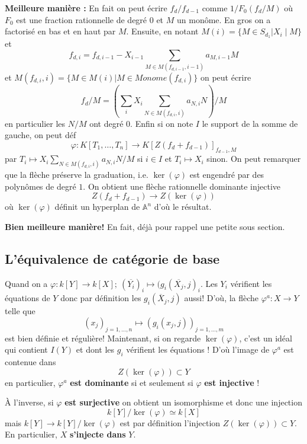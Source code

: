 \documentclass[a4paper,12pt]{book}
\newcommand{\A}{\mathbb{A}}
\theoremstyle{plain}
\theoremstyle{definition}
\theoremstyle{remark}
\begin{document}
\textbf{Meilleure manière :} En fait on peut écrire $f_d/f_{d-1}$ comme
$1/F_0(f_d/M)$ où $F_0$ est une fraction rationnelle de degré $0$ et
$M$ un monôme. En gros on a factorisé en bas et en haut par $M$. Ensuite,
en notant $M(i)=\{M\in S_{d_1}| X_i\mid M\}$ et \[f_{d,i}= f_{d,i-1}-
X_{i-1}\sum_{M\in M(f_{d,i-1},i-1)} a_{M, i-1}M\] et $M(f_{d,i},i)=\{M\in M(i)| M\in Monome(f_{d,i})\}$
on peut écrire
\[f_d/M=\left(\sum_i X_i\sum_{N\in M(f_{d,i}, i)} a_{N, i} N\right)/M\]
en particulier les $N/M$ ont degré $0$. Enfin si on note $I$ le support 
de la somme de gauche, on peut déf 
\[\varphi\colon K[T_1,\ldots,T_n]\to K[Z(f_d+f_{d-1})]_{f_{d-1}, M}\]
par $T_i\mapsto X_i\sum_{N\in M(f_{d,i}, i)} a_{N, i} N/M$ si $i\in I$
et $T_i\mapsto X_i$ sinon. On peut remarquer que la flèche préserve la 
graduation, i.e. $\ker(\varphi)$ est engendré par des polynômes de degré
$1$. On obtient une flèche rationnelle dominante injective
\[Z(f_d+f_{d-1})\to Z(\ker(\varphi))\]
où $\ker(\varphi)$ définit un hyperplan de $\A^n$ d'où le résultat.

\textbf{Bien meilleure manière!} En fait, déjà pour rappel une petite
sous section.
\subsection{L'équivalence de catégorie de base}
Quand on a $\varphi\colon k[Y]\to k[X];~(\overline{Y_i})_i\mapsto 
(g_i(\overline{X_j},j)_i$. Les $Y_i$ vérifient les équations de $Y$
donc par définition les $g_i(\overline{X}_j,j)$ aussi! D'où, la flèche 
$\varphi^a\colon X\to Y$ telle que 
\[(x_j)_{j=1,\ldots,n}\mapsto (g_i(x_j,j))_{j=1,\ldots, m}\]
est bien définie et régulière! Maintenant, si on regarde $\ker(\varphi)$,
c'est un idéal qui contient $I(Y)$ et dont les $g_i$ vérifient les 
équations ! D'où l'image de $\varphi^a$ est contenue dans 
\[Z(\ker(\varphi))\subset Y\]
en particulier, $\varphi^a$ \textbf{est dominante} si et seulement si 
$\varphi$ \textbf{est injective} !

À l'inverse, si $\varphi$ \textbf{est surjective} on obtient un
isomorphisme et donc une injection 
\[k[Y]/\ker(\varphi)\simeq k[X]\]
mais $k[Y]\to k[Y]/\ker(\varphi)$ est par définition l'injection 
$Z(\ker(\varphi))\subset Y$. En particulier, $X$ \textbf{s'injecte dans}
$Y$.
\end{document}
